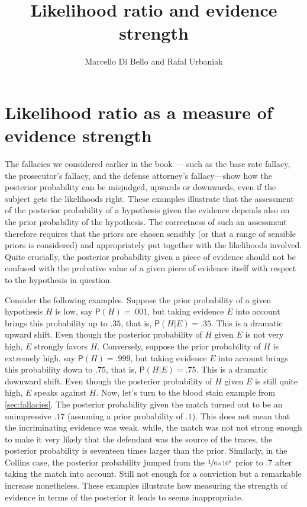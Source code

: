 \documentclass[10pt,dvipsnames,enabledeprecatedfontcommands]{scrartcl}
\title{Likelihood ratio and evidence strength}
\author{Marcello Di Bello and Rafal Urbaniak}
\date{}
\newcommand{\pr}[1]{\mathsf{P}(#1)}
\begin{document}
\maketitle

\hypertarget{likelihood-ratio-as-a-measure-of-evidence-strength}{%
\section{Likelihood ratio as a measure of evidence
strength}\label{likelihood-ratio-as-a-measure-of-evidence-strength}}

The fallacies we considered earlier in the book ---
such as the base rate fallacy, the prosecutor's fallacy, and the defense
attorney's fallacy---show how the posterior probability can be
misjudged, upwards or downwards, even if the subject gets the
likelihoods right. These examples illustrate that the assessment of the
posterior probability of a hypothesis given the evidence depends also on
the prior probability of the hypothesis. The correctness of such an
assessment therefore requires that the priors are chosen sensibly (or
that a range of sensible priors is considered) and appropriately put
together with the likelihoods involved. Quite crucially, the posterior
probability given a piece of evidence should not be confused with the
probative value of a given piece of evidence itself with respect to the
hypothesis in question.

Consider the following examples. Suppose the prior probability of a
given hypothesis \(H\) is low, say \(\pr{H}=.001\), but taking evidence
\(E\) into account brings this probability up to \(.35\), that is,
\(\pr{H \vert E}=.35\). This is a dramatic upward shift. Even though the
posterior probability of \(H\) given \(E\) is not very high, \(E\)
strongly favors \(H\). Conversely, suppose the prior probability of
\(H\) is extremely high, say \(\pr{H}=.999\), but taking evidence \(E\)
into account brings this probability down to \(.75\), that is,
\(\pr{H \vert E}=.75\). This is a dramatic downward shift. Even though
the posterior probability of \(H\) given \(E\) is still quite high,
\(E\) speaks against \(H\). Now, let's turn to the blood stain example
from \ref{sec:fallacies}. The posterior probability
given the match turned out to be an unimpressive \(.17\) (assuming a
prior probability of \(.1\)). This does not mean that the incriminating
evidence was weak. while, the match was not not strong enough to make it
very likely that the defendant was the source of the traces, the
posterior probability is seventeen times larger than the prior.
Similarly, in the Collins case, the posterior probability jumped from
the \(\nicefrac{1}{6 \times 10^6}\) prior to \(.7\) after taking the
match into account. Still not enough for a conviction but a remarkable
increase nonetheless. These examples illustrate how measuring the
strength of evidence in terms of the posterior it leads to seems
inappropriate.
\end{document}
